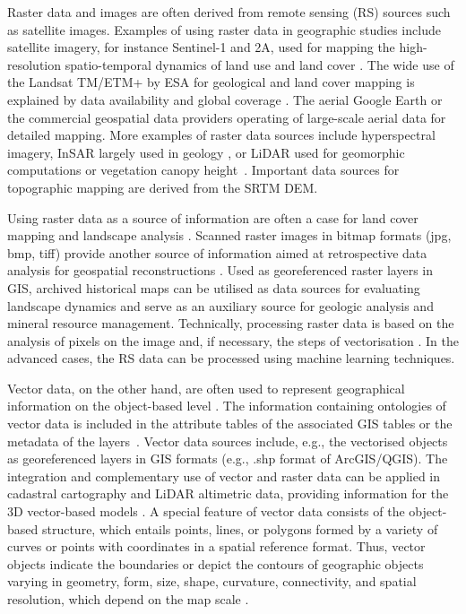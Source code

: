 \documentclass[data,article,accept,pdftex,moreauthors]{Definitions/mdpi}
\begin{document}
Raster data and images are often derived from remote sensing (RS) sources such as satellite images. Examples of using raster{ }data in {geographic} studies include satellite imagery, for instance  Sentinel-1 and 2A, used {for} mapping the high-resolution spatio-temporal dynamics of land use and land cover \cite{MERCIER2021107408,BALENZANO2021107345}. The wide {use} of the Landsat TM/ETM+ by ESA for geological and land cover mapping is {explained} by data availability and global coverage \cite{ALLENBY1987137,LOMBARDO,SAMARA}. The aerial Google Earth or the commercial geospatial data providers operating of large-scale aerial data for detailed mapping. More examples of raster data sources include hyperspectral imagery, InSAR largely used in geology{ } \cite{TALIB2022112793,LI2022114}, or LiDAR used for geomorphic computations or vegetation canopy height~\cite{NEUGIRG2016269,NAKAO2022119953}{. }Important{ }data sources for topographic mapping are {derived from} the SRTM DEM. 

Using raster data as a source of {information} are often a case for land cover mapping and landscape analysis \cite{SZABO2019104187,RUJOIUMARE2016244,LI2021112670}. Scanned raster images in bitmap formats (jpg, bmp, tiff) provide {another} source of {information} aimed at retrospective data analysis {for} geospatial reconstructions \cite{KRAL2021107382,OSTAFIN2022107709}. Used as georeferenced raster layers in GIS, archived historical maps can be utilised as data sources for {evaluating landscape} dynamics and serve as {an} auxiliary source for geologic analysis and mineral resource management. Technically, processing raster data is based on the analysis of pixels on the image and, if necessary, the steps of vectorisation \cite{8937640,6723417,8810063}. In the advanced cases, the RS data can be processed using machine learning techniques. 

Vector data, on the other hand, are often used to represent geographical information on the object-based level \cite{LI20121331,KOCH200623}. The information containing {ontologies} of vector data is included in the attribute tables of the associated GIS tables {or the} metadata of the layers~\cite{LI20121344}. Vector data sources include, e.g., the vectorised objects as georeferenced layers in GIS formats (e.g., {.shp} format of ArcGIS/QGIS). The integration and complementary use of vector {and} raster data can be {applied in} cadastral cartography and LiDAR altimetric data, providing information for the 3D vector-based {models} \cite{VIANAFONS2020110258}. A special feature of vector data consists of {the} object-based structure, which entails points, lines, or polygons formed by a variety of curves or points with coordinates in a spatial reference format. Thus, vector objects indicate {the} boundaries or depict the contours of geographic objects {varying} in geometry, form, size, shape, curvature, connectivity, and spatial resolution, {which depend} on {the} map scale \cite{GULER2021107755}.
\end{document}
